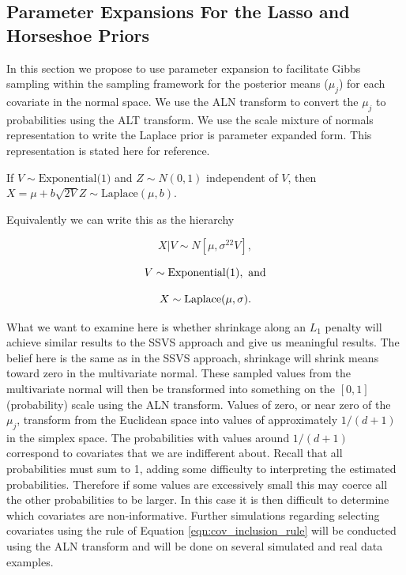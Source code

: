 \subsection{Parameter Expansions For the Lasso and Horseshoe Priors}\label{sec:PX_2}
In this section we propose to use parameter expansion to facilitate Gibbs sampling within the sampling framework for the posterior means ($\mu_j$) for each covariate in the normal space. We use the ALN transform to convert the $\mu_j$ to probabilities using the ALT transform. 
We use the scale mixture of normals representation to write the Laplace prior is parameter expanded form. This representation is stated here for reference.

If $V \sim \text{Exponential(1)}$ and $Z \sim N(0, 1)$ independent of $V$, then $X = \mu + b \sqrt{2 V}Z \sim \mathrm{Laplace}(\mu,b)$. 

Equivalently we can write this as the hierarchy

\begin{equation}\label{eqn:normal_cond_lhood_lasso}
X \vert V \sim N[\mu, \sigma^22V],
\end{equation}

\begin{equation}\newnot{symbol:exponential_dist}
V \sim \text{Exponential}(1), \text{ and}
\end{equation}

\begin{equation}\newnot{symbol:laplace_dist}
X \sim \text{Laplace}(\mu, \sigma).
\end{equation}

What we want to examine here is whether shrinkage along an $L_1$ penalty will achieve similar results to the SSVS approach and give us meaningful results. The belief here is the same as in the SSVS approach, shrinkage will shrink means toward zero in the multivariate normal. These sampled values from the multivariate normal will then be transformed into something on the $[0,1]$ (probability) scale using the ALN transform. Values of zero, or near zero of the $\mu_j$, transform from the Euclidean space into values of approximately $1/(d+1)$ in the simplex space. The probabilities with values around $1/(d+1)$ correspond to covariates that we are indifferent about. Recall that all probabilities must sum to 1, adding some difficulty to interpreting the estimated probabilities. Therefore if some values are excessively small this may coerce all the other probabilities to be larger. In this case it is then difficult to determine which covariates are non-informative. Further simulations regarding selecting covariates using the rule of Equation \ref{eqn:cov_inclusion_rule} will be conducted using the ALN transform and will be done on several simulated and real data examples.    

